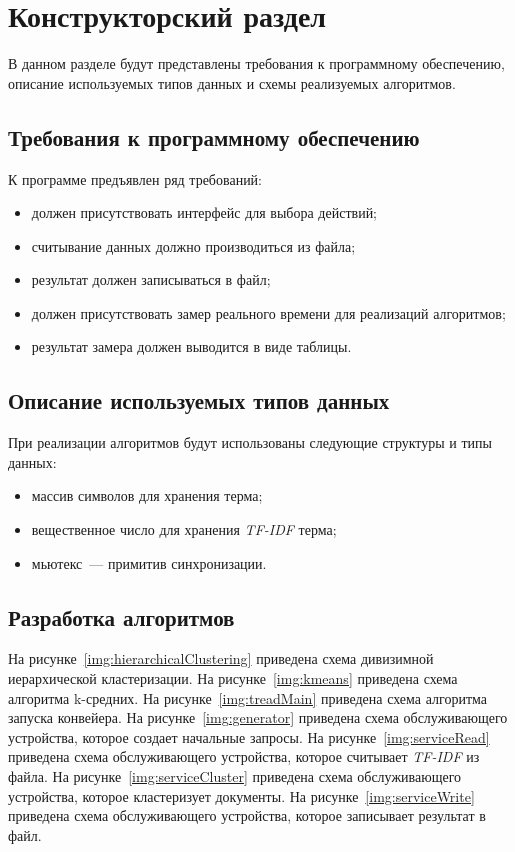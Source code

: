 \chapter{Конструкторский раздел}

В данном разделе будут представлены требования к программному обеспечению, описание используемых типов данных и схемы реализуемых алгоритмов.

\section{Требования к программному обеспечению}

К программе предъявлен ряд требований:
\begin{itemize}
	\item должен присутствовать интерфейс для выбора действий;
	\item считывание данных должно производиться из файла;
	\item результат должен записываться в файл;
	\item должен присутствовать замер реального времени для реализаций
	алгоритмов;
	\item результат замера должен выводится в виде таблицы.
\end{itemize}

\section{Описание используемых типов данных}

При реализации алгоритмов будут использованы следующие структуры и типы данных:
\begin{itemize}
	\item массив символов для хранения терма;
	\item вещественное число для хранения \textit{TF-IDF} терма;
	\item мьютекс~--- примитив синхронизации.
\end{itemize}

\section{Разработка алгоритмов}

На рисунке~\ref{img:hierarchicalClustering} приведена схема дивизимной иерархической кластеризации.
На рисунке~\ref{img:kmeans} приведена схема алгоритма k-средних.
На рисунке~\ref{img:treadMain} приведена схема алгоритма запуска конвейера.
На рисунке~\ref{img:generator} приведена схема обслуживающего устройства, которое создает начальные запросы.
На рисунке~\ref{img:serviceRead} приведена схема обслуживающего устройства, которое считывает \textit{TF-IDF} из файла.
На рисунке~\ref{img:serviceCluster} приведена схема обслуживающего устройства, которое кластеризует документы.
На рисунке~\ref{img:serviceWrite} приведена схема обслуживающего устройства, которое записывает результат в файл.




